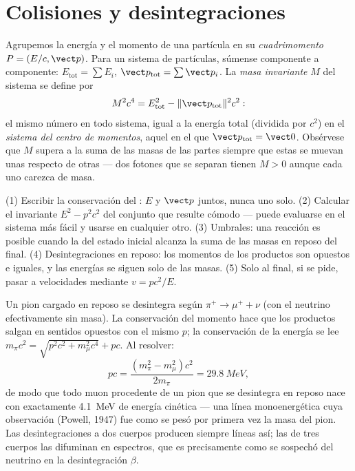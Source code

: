 \section{Colisiones y desintegraciones}

\begin{definition}\label{def:b3:relativistic-dynamics:four-momentum}
Agrupemos la energía y el momento de una partícula en su \emph{cuadrimomento}
$P = (E/c, \vect p)$. Para un sistema de partículas, súmense componente a
componente: $E_{\text{tot}} = \sum E_i$, $\vect p_{\text{tot}} = \sum\vect p_i$.
La \emph{masa invariante} $M$ del sistema se define por
\[
M^2c^4 = E_{\text{tot}}^2 - \|\vect p_{\text{tot}}\|^2c^2 :
\]
el mismo número en todo sistema, igual a la energía total (dividida por
$c^2$) en el \emph{sistema del centro de momentos}, aquel en el que
$\vect p_{\text{tot}} = \vect 0$. Obsérvese que $M$ supera a la suma de las
masas de las partes siempre que estas se muevan unas respecto de otras ---
dos fotones que se separan tienen $M > 0$ aunque cada uno carezca de masa.
\end{definition}

\begin{method}\label{met:b3:relativistic-dynamics:method}
(1) Escribir la conservación del : $E$ y $\vect p$ juntos,
nunca uno solo. (2) Calcular el invariante $E^2 - p^2c^2$ del conjunto que
resulte cómodo --- puede evaluarse en el sistema más fácil y usarse en
cualquier otro. (3) Umbrales: una reacción es posible cuando la  del estado inicial alcanza la suma de las masas en reposo del
final. (4) Desintegraciones en reposo: los momentos de los productos son
opuestos e iguales, y las energías se siguen solo de las masas. (5) Solo al
final, si se pide, pasar a velocidades mediante $v = pc^2/E$.
\end{method}

\begin{example}\label{ex:b3:relativistic-dynamics:pion}
Un pion cargado en reposo se desintegra según $\pi^+ \to \mu^+ + \nu$ (con
el neutrino efectivamente sin masa). La conservación del momento hace que
los productos salgan en sentidos opuestos con el mismo $p$; la conservación
de la energía se lee $m_\pi c^2 =
\sqrt{p^2c^2 + m_\mu^2c^4} + pc$. Al resolver:
\[
pc = \frac{(m_\pi^2 - m_\mu^2)c^2}{2m_\pi} = \qty{29.8}{MeV} ,
\]
de modo que todo muon procedente de un pion que se desintegra en reposo nace
con exactamente \qty{4.1}{MeV} de energía cinética --- una línea
monoenergética cuya observación (Powell, 1947) fue como se pesó por primera
vez la masa del pion. Las desintegraciones a dos cuerpos producen siempre
líneas así; las de tres cuerpos las difuminan en espectros, que es
precisamente como se sospechó del neutrino en la desintegración $\beta$.
\end{example}

